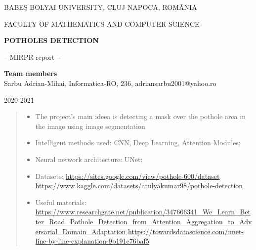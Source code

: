 \documentclass[runningheads,a4paper,11pt]{report}
\begin{document}
\begin{titlepage}
\sloppy

\begin{center}
BABE\c S BOLYAI UNIVERSITY, CLUJ NAPOCA, ROM\^ ANIA

FACULTY OF MATHEMATICS AND COMPUTER SCIENCE

\vspace{6cm}

\Huge \textbf{POTHOLES DETECTION}

\vspace{1cm}

\normalsize -- MIRPR report --

\end{center}


\vspace{5cm}

\begin{flushright}
\Large{\textbf{Team members}}\\
Sarbu Adrian-Mihai, Informatica-RO, 236, adriansarbu2001@yahoo.ro
\end{flushright}

\vspace{4cm}

\begin{center}
2020-2021
\end{center}

\end{titlepage}


\begin{abstract}
	\begin{itemize}
		\item The project's main ideea is detecting a mask over the pothole area in the image using image segmentation
		\item Intelligent methods used: CNN, Deep Learning, Attention Modules;
		\item Neural network architecture: UNet;
		\item Datasets:
            \subitem \url{https://sites.google.com/view/pothole-600/dataset}
            \subitem \url{https://www.kaggle.com/datasets/atulyakumar98/pothole-detection}
        \item Useful materials:
            \subitem\url{https://www.researchgate.net/publication/347666341_We_Learn_Better_Road_Pothole_Detection_from_Attention_Aggregation_to_Adversarial_Domain_Adaptation}
            \subitem\url{https://towardsdatascience.com/unet-line-by-line-explanation-9b191c76baf5}

	\end{itemize}
\end{abstract}
\end{document}
